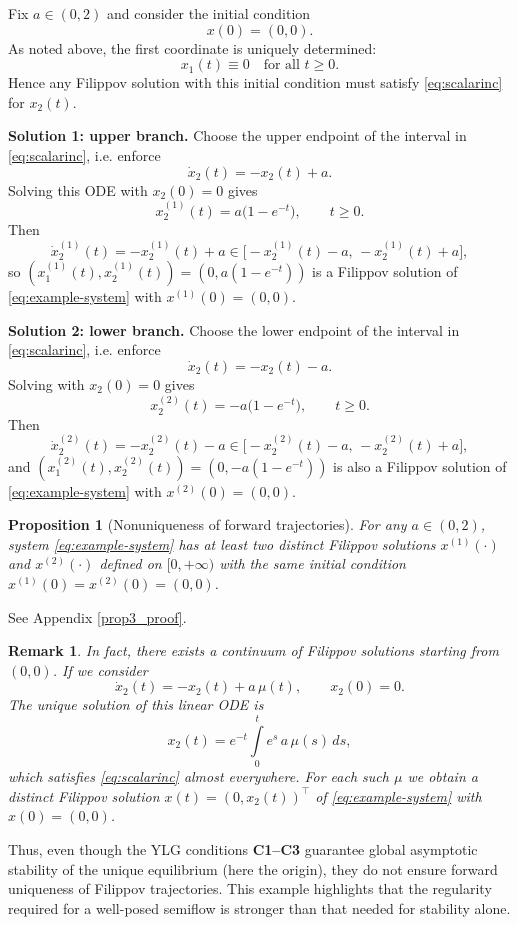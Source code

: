 \documentclass[journal]{IEEEtran}
\newtheorem{proposition}{Proposition}
\newtheorem{remark}{Remark}
\begin{document}
Fix $a\in(0,2)$ and consider the initial condition
\[
x(0)=(0,0).
\]
As noted above, the first coordinate is uniquely determined:
\[
x_{1}(t)\equiv 0\quad\text{for all }t\geq 0.
\]
Hence any Filippov solution with this initial condition must satisfy \eqref{eq:scalarinc} for $x_{2}(t)$.

\medskip
\textbf{Solution 1: upper branch.}
Choose the upper endpoint of the interval in \eqref{eq:scalarinc}, i.e. enforce
\[
\dot{x}_{2}(t)=-x_{2}(t)+a.
\]
Solving this ODE with $x_{2}(0)=0$ gives
\[
x_{2}^{(1)}(t)=a\bigl(1-e^{-t}\bigr),\qquad t\geq 0.
\]
Then
\[
\dot{x}_{2}^{(1)}(t)=-x_{2}^{(1)}(t)+a\in\bigl[-x_{2}^{(1)}(t)-a,\,-x_{2}^{(1)}(t)+a\bigr],
\]
so $(x_{1}^{(1)}(t),x_{2}^{(1)}(t))=(0,a(1-e^{-t}))$ is a Filippov solution of \eqref{eq:example-system} with $x^{(1)}(0)=(0,0)$.

\medskip
\textbf{Solution 2: lower branch.}
Choose the lower endpoint of the interval in \eqref{eq:scalarinc}, i.e. enforce
\[
\dot{x}_{2}(t)=-x_{2}(t)-a.
\]
Solving with $x_{2}(0)=0$ gives
\[
x_{2}^{(2)}(t)=-a\bigl(1-e^{-t}\bigr),\qquad t\geq 0.
\]
Then
\[
\dot{x}_{2}^{(2)}(t)=-x_{2}^{(2)}(t)-a\in\bigl[-x_{2}^{(2)}(t)-a,\,-x_{2}^{(2)}(t)+a\bigr],
\]
and $(x_{1}^{(2)}(t),x_{2}^{(2)}(t))=(0,-a(1-e^{-t}))$ is also a Filippov solution of \eqref{eq:example-system} with $x^{(2)}(0)=(0,0)$.

\begin{proposition}[Nonuniqueness of forward trajectories]\label{eq:example-system}
For any $a\in(0,2)$, system \eqref{eq:example-system} has at least two distinct Filippov solutions $x^{(1)}(\cdot)$ and $x^{(2)}(\cdot)$ defined on $[0,+\infty)$ with the same initial condition $x^{(1)}(0)=x^{(2)}(0)=(0,0)$.
\end{proposition}
\begin{IEEEproof}
See Appendix \ref{prop3_proof}.
\end{IEEEproof}

\begin{remark}
In fact, there exists a continuum of Filippov solutions starting from $(0,0)$. If we consider
\[
\dot{x}_{2}(t)=-x_{2}(t)+a\,\mu(t),\qquad x_{2}(0)=0.
\]
The unique solution of this linear ODE is
\[
x_{2}(t)=e^{-t}\int\limits_{0}^{t}e^{s}\,a\,\mu(s)\,ds,
\]
which satisfies \eqref{eq:scalarinc} almost everywhere. For each such $\mu$ we obtain a distinct Filippov solution $x(t)=(0,x_{2}(t))^{\top}$ of \eqref{eq:example-system} with $x(0)=(0,0)$.
\end{remark}


Thus, even though the YLG conditions \textbf{C1--C3} guarantee global asymptotic stability of the unique equilibrium (here the origin), they do not ensure forward uniqueness of Filippov trajectories. This example highlights that the regularity required for a well-posed semiflow is stronger than that needed for stability alone.
\end{document}
